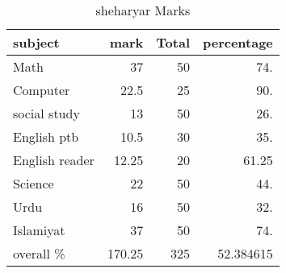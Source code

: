 \documentclass[11pt]{article}
\author{gnu}
\date{\today}
\title{}
\begin{document}
\tableofcontents

\begin{table}[htbp]
\caption{\label{tab:orge08a406}
sheharyar Marks}
\begin{tabular}{lrrr}
\hline
subject & mark & Total & percentage\\
\hline
Math & 37 & 50 & 74.\\
Computer & 22.5 & 25 & 90.\\
social study & 13 & 50 & 26.\\
English ptb & 10.5 & 30 & 35.\\
English reader & 12.25 & 20 & 61.25\\
Science & 22 & 50 & 44.\\
Urdu & 16 & 50 & 32.\\
Islamiyat & 37 & 50 & 74.\\
\hline
overall \% & 170.25 & 325 & 52.384615\\
\hline
\end{tabular}
\end{table}
\end{document}
